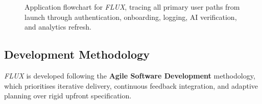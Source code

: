 \documentclass[12pt,a4paper]{article}
\newcommand{\FL}{\textit{FLUX}}
\begin{document}
\begin{figure}[H]
\begin{tikzpicture}
\end{tikzpicture}
\caption{Application flowchart for \FL{}, tracing all primary user paths from
launch through authentication, onboarding, logging, AI verification, and analytics
refresh.}
\label{fig:flowchart}
\end{figure}

\subsection{Development Methodology}

\FL{} is developed following the \textbf{Agile Software Development} methodology,
which prioritises iterative delivery, continuous feedback integration, and adaptive
planning over rigid upfront specification.
\end{document}
